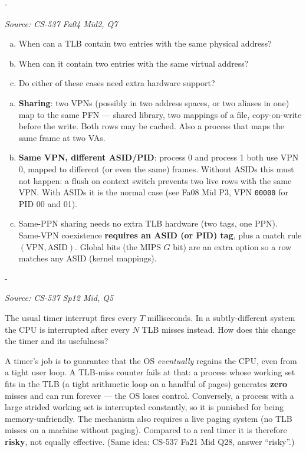 \documentclass[11pt,a4paper]{article}
\makeatletter
\newcommand{\keepspace}[1]{\par\penalty-100\begingroup
  \setlength{\dimen@}{#1}\dimen@ii\pagegoal\advance\dimen@ii-\pagetotal
  \ifdim\dimen@>\dimen@ii\ifdim\dimen@ii>\z@\vfil\fi\break\fi\endgroup}
\newcounter{qn}[section]
\newenvironment{Qn}[4]{%
  \refstepcounter{qn}\keepspace{7\baselineskip}%
  \begin{tcolorbox}[qboxstyle, title={Q\thesection.\theqn\ \ [#1 \textbar\ #2]\ \ #4}]%
  {\footnotesize\color{g3}\textit{Source: #3}}\par\smallskip%
}{%
  \end{tcolorbox}%
}
\newenvironment{Sol}{%
  \begin{tcolorbox}[sboxstyle, title={Solution}]%
}{%
  \end{tcolorbox}\vspace{0.35em}%
}
\makeatother
\begin{document}
\begin{Qn}{Medium}{Lect 13}{CS-537 Fa04 Mid2, Q7}{Two TLB rows with the same PPN, or the same VPN}
\begin{enumerate}[(a)]
\item When can a TLB contain two entries with the same physical address?
\item When can it contain two entries with the same virtual address?
\item Do either of these cases need extra hardware support?
\end{enumerate}
\end{Qn}
\begin{Sol}
\begin{enumerate}[(a)]
\item \textbf{Sharing}: two VPNs (possibly in two address spaces, or
      two aliases in one) map to the same PFN --- shared library, two
      mappings of a file, copy-on-write before the write. Both rows
      may be cached. Also a process that maps the same frame at two
      VAs.
\item \textbf{Same VPN, different ASID/PID}: process 0 and process 1
      both use VPN 0, mapped to different (or even the same) frames.
      Without ASIDs this must not happen: a flush on context switch
      prevents two live rows with the same VPN. With ASIDs it is the
      normal case (see Fa08 Mid P3, VPN \texttt{00000} for PID 00 and
      01).
\item Same-PPN sharing needs no extra TLB hardware (two tags, one
      PPN). Same-VPN coexistence \textbf{requires an ASID (or PID)
      tag}, plus a match rule $(\mathrm{VPN},\mathrm{ASID})$. Global
      bits (the MIPS $G$ bit) are an extra option so a row matches any
      ASID (kernel mappings).
\end{enumerate}
\end{Sol}

\begin{Qn}{Medium}{Lect 13}{CS-537 Sp12 Mid, Q5}{Timer interrupt driven by TLB misses}
The usual timer interrupt fires every $T$ milliseconds. In a
subtly-different system the CPU is interrupted after every $N$ TLB
misses instead. How does this change the timer and its usefulness?
\end{Qn}
\begin{Sol}
A timer's job is to guarantee that the OS \emph{eventually} regains the
CPU, even from a tight user loop. A TLB-miss counter fails at that:
a process whose working set fits in the TLB (a tight arithmetic loop
on a handful of pages) generates \textbf{zero} misses and can run
forever --- the OS loses control. Conversely, a process with a large
strided working set is interrupted constantly, so it is punished for
being memory-unfriendly. The mechanism also requires a live paging
system (no TLB misses on a machine without paging). Compared to a
real timer it is therefore \textbf{risky}, not equally effective.
(Same idea: CS-537 Fa21 Mid Q28, answer ``risky''.)
\end{Sol}
\end{document}
